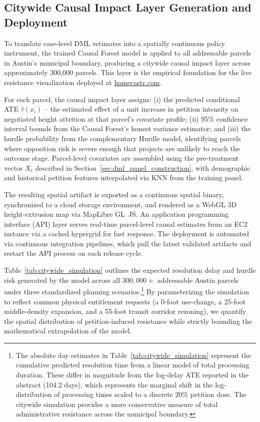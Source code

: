 \documentclass[11pt, letterpaper, oneside]{article}
\begin{document}
\subsection{Citywide Causal Impact Layer Generation and Deployment}
\label{sec:causal_impact_layer}

To translate case-level DML estimates into a spatially continuous policy instrument, the trained Causal Forest model is applied to all addressable parcels in Austin's municipal boundary, producing a citywide causal impact layer across approximately 300,000 parcels. This layer is the empirical foundation for the live resistance visualization deployed at \href{https://www.homecastr.com/friction-viz.html}{homecastr.com}.

For each parcel, the causal impact layer assigns: (i) the predicted conditional ATE $\hat{\tau}(x_i)$ -- the estimated effect of a unit increase in petition intensity on negotiated height attrition at that parcel's covariate profile; (ii) 95\% confidence interval bounds from the Causal Forest's honest variance estimator; and (iii) the hurdle probability from the complementary Hurdle model, identifying parcels where opposition risk is severe enough that projects are unlikely to reach the outcome stage. Parcel-level covariates are assembled using the pre-treatment vector $X_i$ described in Section~\ref{sec:dml_panel_construction}, with demographic and historical petition features interpolated via KNN from the training panel.

The resulting spatial artifact is exported as a continuous spatial binary, synchronized to a cloud storage environment, and rendered as a WebGL 3D height-extrusion map via MapLibre GL~JS. An application programming interface (API) layer serves real-time parcel-level causal estimates from an EC2 instance via a cached hypergrid for fast response. The deployment is automated via continuous integration pipelines, which pull the latest validated artifacts and restart the API process on each release cycle.

Table~\ref{tab:citywide_simulation} outlines the expected resolution delay and hurdle risk generated by the model across all $300,000+$ addressable Austin parcels under three standardized planning scenarios.\footnote{The absolute day estimates in Table~\ref{tab:citywide_simulation} represent the cumulative predicted resolution time from a linear model of total processing duration. These differ in magnitude from the log-delay ATE reported in the abstract (104.2 days), which represents the marginal shift in the log-distribution of processing times scaled to a discrete 20\% petition dose. The citywide simulation provides a more conservative measure of total administrative resistance across the municipal boundary.} By parameterizing the simulation to reflect common physical entitlement requests (a 0-foot use-change, a 25-foot middle-density expansion, and a 55-foot transit corridor rezoning), we quantify the spatial distribution of petition-induced resistance while strictly bounding the mathematical extrapolation of the model.
\end{document}
